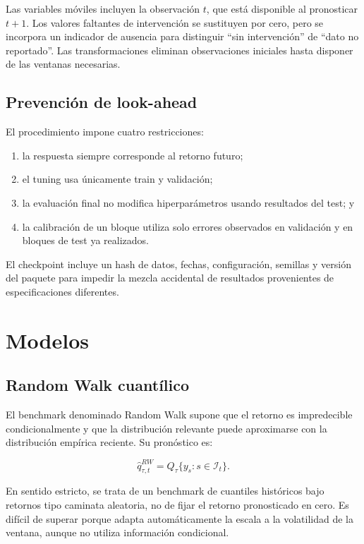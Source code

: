 \documentclass[11pt,a4paper]{article}
\begin{document}
Las variables móviles incluyen la observación \(t\), que está disponible al
pronosticar \(t+1\). Los valores faltantes de intervención se sustituyen por
cero, pero se incorpora un indicador de ausencia para distinguir ``sin
intervención'' de ``dato no reportado''. Las transformaciones eliminan
observaciones iniciales hasta disponer de las ventanas necesarias.

\subsection{Prevención de look-ahead}

El procedimiento impone cuatro restricciones:

\begin{enumerate}[leftmargin=*]
  \item la respuesta siempre corresponde al retorno futuro;
  \item el tuning usa únicamente train y validación;
  \item la evaluación final no modifica hiperparámetros usando resultados
  del test; y
  \item la calibración de un bloque utiliza solo errores observados en
  validación y en bloques de test ya realizados.
\end{enumerate}

El checkpoint incluye un hash de datos, fechas, configuración, semillas y
versión del paquete para impedir la mezcla accidental de resultados
provenientes de especificaciones diferentes.

\section{Modelos}

\subsection{Random Walk cuantílico}

El benchmark denominado Random Walk supone que el retorno es impredecible
condicionalmente y que la distribución relevante puede aproximarse con la
distribución empírica reciente. Su pronóstico es:

\begin{equation}
  \widehat q_{\tau,t}^{RW}
  =
  Q_{\tau}\{y_s:s\in\mathcal{I}_t\}.
\end{equation}

En sentido estricto, se trata de un benchmark de cuantiles históricos bajo
retornos tipo caminata aleatoria, no de fijar el retorno pronosticado en
cero. Es difícil de superar porque adapta automáticamente la escala a la
volatilidad de la ventana, aunque no utiliza información condicional.
\end{document}
